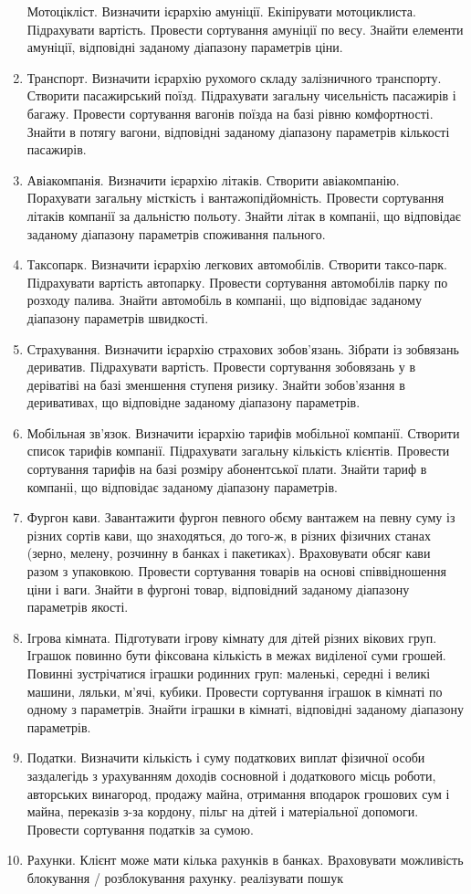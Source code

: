 \documentclass[]{article}
\begin{document}
\begin{enumerate}
Мотоцікліст. Визначити ієрархію амуніції. Екіпірувати мотоциклиста. Підрахувати вартість. Провести сортування амуніції по весу. Знайти елементи амуніції, відповідні заданому діапазону параметрів ціни.
\item
Транспорт. Визначити ієрархію рухомого складу залізничного транспорту. Створити пасажирський поїзд. Підрахувати загальну чисельність пасажирів і багажу. Провести сортування вагонів поїзда на базі рівню комфортності. Знайти в потягу вагони, відповідні заданому діапазону параметрів кількості пасажирів.
\item  Авіакомпанія. Визначити ієрархію літаків. Створити авіакомпанію. Порахувати загальну місткість і вантажопідйомність. Провести сортування літаків компанії за дальністю польоту. Знайти літак в компаніі, що відповідає заданому діапазону параметрів споживання пального.
\item  Таксопарк. Визначити ієрархію легкових автомобілів. Створити таксо-парк. Підрахувати вартість автопарку. Провести сортування автомобілів парку по  розходу палива. Знайти автомобіль в компаніі, що відповідає заданому діапазону параметрів швидкості.
\item  Страхування. Визначити ієрархію страхових зобов'язань. Зібрати із зобвязань дериватив. Підрахувати вартість. Провести сортування зобовязань у в деріватіві на базі зменшення ступеня ризику. Знайти зобов'язання в деривативах, що  відповідне заданому діапазону параметрів.
\item  Мобільная зв'язок. Визначити ієрархію тарифів мобільної компанії. Створити список тарифів компанії. Підрахувати загальну кількість клієнтів. Провести сортування тарифів на базі розміру абонентської плати. Знайти тариф в компаніі, що відповідає заданому діапазону параметрів.
\item  Фургон кави. Завантажити фургон певного обєму вантажем на певну суму із різних сортів кави, що знаходяться, до того-ж, в різних фізичних станах (зерно, мелену, розчинну в банках і пакетиках). Враховувати обсяг кави разом з упаковкою. Провести сортування товарів на основі співвідношення ціни і ваги. Знайти в фургоні товар, відповідний заданому діапазону параметрів якості.
\item  Ігрова кімната. Підготувати ігрову кімнату для дітей різних вікових груп. Іграшок повинно бути фіксована кількість в межах виділеної суми грошей. Повинні зустрічатися іграшки родинних груп: маленькі, середні і великі машини, ляльки, м'ячі, кубики. Провести сортування іграшок в кімнаті по одному з параметрів. Знайти іграшки в кімнаті, відповідні заданому діапазону параметрів.
\item  Податки. Визначити кількість і суму податкових виплат фізичної особи заздалегідь з урахуванням доходів сосновной і додаткового місць роботи, авторських винагород, продажу майна, отримання вподарок грошових сум і майна, переказів з-за кордону, пільг на дітей і матеріальної допомоги. Провести сортування податків за сумою.
\item  Рахунки. Клієнт може мати кілька рахунків в банках. Враховувати можливість блокування / розблокування рахунку. реалізувати пошук

\end{enumerate}
\end{document}
